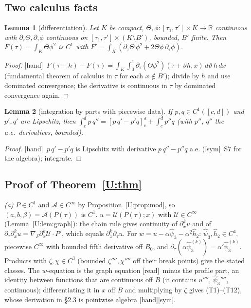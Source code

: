 \documentclass[11pt]{article}
\newtheorem{lemma}{Lemma}\newtheorem{proposition}{Proposition}\newtheorem{remark}{Remark}\newtheorem{theorem}{Theorem}\newtheorem{definition}{Definition}
\newcommand{\fn}[1]{\texttt{\detokenize{#1}}}
\newcommand{\tH}{\textup{[hand]}}\newcommand{\tS}{\textup{[sym]}}\newcommand{\tR}{\textup{[read]}}\newcommand{\tL}{\textup{[Lean]}}\newcommand{\tD}{\textup{[DKS]}}\newcommand{\tI}{\textup{[inh]}}
\begin{document}
\subsection{Two calculus facts}
\begin{lemma}[differentiation]\label{U:lem:leib}
Let $K$ be compact, $\Theta,\phi:[\tau_1,\tau']\times K\to\mathbb R$ continuous with $\partial_\tau\Theta,\partial_\tau\phi$ continuous on $[\tau_1,\tau']\times(K\setminus B')$, bounded, $B'$ finite. Then $F(\tau)=\int_K\Theta\phi^2$ is $C^1$ with $F'=\int_K(\partial_\tau\Theta\,\phi^2+2\Theta\phi\,\partial_\tau\phi)$.
\end{lemma}
\begin{proof}\tH\ $F(\tau+h)-F(\tau)=\int_K\int_0^1\partial_\tau(\Theta\phi^2)(\tau+\vartheta h,x)\,d\vartheta\,h\,dx$ (fundamental theorem of calculus in $\tau$ for each $x\notin B'$); divide by $h$ and use dominated convergence; the derivative is continuous in $\tau$ by dominated convergence again.
\end{proof}
\begin{lemma}[integration by parts with piecewise data]\label{U:lem:ibp}
If $p,q\in C^1([c,d])$ and $p',q'$ are Lipschitz, then $\int_c^dp\,q''=[p\,q'-p'q]_c^d+\int_c^dp''q$ (with $p''$, $q''$ the a.e.\ derivatives, bounded).
\end{lemma}
\begin{proof}\tH\ $p\,q'-p'q$ is Lipschitz with derivative $p\,q''-p''q$ a.e. (\tS\ S7 for the algebra); integrate.
\end{proof}

\subsection{Proof of Theorem~\ref{U:thm}}
\emph{(a)} $P\in C^1$ and $\mathcal A\in C^\infty$ by Proposition~\ref{U:prop:mod}, so $(a,b,\beta)=\mathcal A(P(\tau))$ is $C^1$. $u=\mathcal U(P(\tau);x)$ with $\mathcal U\in C^\infty$ (Lemma~\ref{U:lem:graph}): the chain rule gives continuity of $\partial_x^ku$ and of $\partial_\tau\partial_x^ku=\nabla_P\partial_x^k\mathcal U\cdot P'$, which equals $\partial_x^k\partial_\tau u$. For $w=u-\alpha\hat\psi_3-\alpha^2\hat h_2$: $\hat\psi_3,\hat h_2\in C^4$, piecewise $C^\infty$ with bounded fifth derivative off $B_0$, and $\partial_\tau(\alpha\hat\psi_3^{(k)})=\alpha'\hat\psi_3^{(k)}$. Products with $\zeta,\chi\in C^3$ (bounded $\zeta'''',\chi''''$ off their break points) give the stated classes. The $w$-equation is the graph equation \tR\ minus the profile part, an identity between functions that are continuous off $B$ (it contains $u''''$, $\hat\psi_3''''$, continuous); differentiating it in $x$ off $B$ and multiplying by $\zeta$ gives (T1)--(T12), whose derivation in \fn{EI_SPEC.md} \S2.3 is pointwise algebra \tH\tS.
\end{document}
